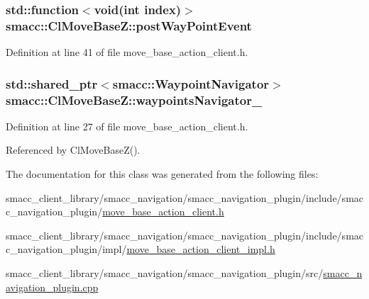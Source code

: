 \subsubsection[{\texorpdfstring{post\+Way\+Point\+Event}{postWayPointEvent}}]{\setlength{\rightskip}{0pt plus 5cm}std\+::function$<$void(int index)$>$ smacc\+::\+Cl\+Move\+Base\+Z\+::post\+Way\+Point\+Event\hspace{0.3cm}{\ttfamily [private]}}\hypertarget{classsmacc_1_1ClMoveBaseZ_a085a93e68532a6c66e9499d9a1318668}{}\label{classsmacc_1_1ClMoveBaseZ_a085a93e68532a6c66e9499d9a1318668}


Definition at line 41 of file move\+\_\+base\+\_\+action\+\_\+client.\+h.

\subsubsection[{\texorpdfstring{waypoints\+Navigator\+\_\+}{waypointsNavigator_}}]{\setlength{\rightskip}{0pt plus 5cm}std\+::shared\+\_\+ptr$<${\bf smacc\+::\+Waypoint\+Navigator}$>$ smacc\+::\+Cl\+Move\+Base\+Z\+::waypoints\+Navigator\+\_\+}\hypertarget{classsmacc_1_1ClMoveBaseZ_a9df38a2b5fb0e0ed23a00d66fb9b9c20}{}\label{classsmacc_1_1ClMoveBaseZ_a9df38a2b5fb0e0ed23a00d66fb9b9c20}


Definition at line 27 of file move\+\_\+base\+\_\+action\+\_\+client.\+h.



Referenced by Cl\+Move\+Base\+Z().



The documentation for this class was generated from the following files\+:\begin{DoxyCompactItemize}
\item 
smacc\+\_\+client\+\_\+library/smacc\+\_\+navigation/smacc\+\_\+navigation\+\_\+plugin/include/smacc\+\_\+navigation\+\_\+plugin/\hyperlink{move__base__action__client_8h}{move\+\_\+base\+\_\+action\+\_\+client.\+h}\item 
smacc\+\_\+client\+\_\+library/smacc\+\_\+navigation/smacc\+\_\+navigation\+\_\+plugin/include/smacc\+\_\+navigation\+\_\+plugin/impl/\hyperlink{move__base__action__client__impl_8h}{move\+\_\+base\+\_\+action\+\_\+client\+\_\+impl.\+h}\item 
smacc\+\_\+client\+\_\+library/smacc\+\_\+navigation/smacc\+\_\+navigation\+\_\+plugin/src/\hyperlink{smacc__navigation__plugin_8cpp}{smacc\+\_\+navigation\+\_\+plugin.\+cpp}\end{DoxyCompactItemize}
